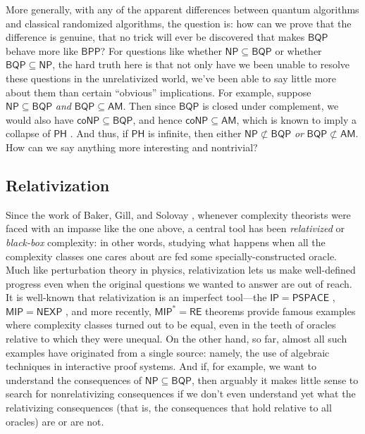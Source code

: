 \documentclass[10pt,a4paper]{article}
\begin{document}
More generally, with any of the apparent differences between quantum algorithms and classical randomized algorithms, the question is: how can we prove that the difference is genuine, that no trick will ever be discovered that makes $\mathsf{BQP}$ behave more like $\mathsf{BPP}$? For questions like whether $\mathsf{NP} \subseteq \mathsf{BQP}$ or whether $\mathsf{BQP} \subseteq \mathsf{NP}$, the hard truth here is that not only have we been unable to resolve these questions in the unrelativized world, we've been able to say little more about them than certain ``obvious'' implications.  For example, suppose $\mathsf{NP} \subseteq \mathsf{BQP}$ \textit{and} $\mathsf{BQP} \subseteq \mathsf{AM}$.  Then since $\mathsf{BQP}$ is closed under complement, we would also have $\mathsf{coNP} \subseteq \mathsf{BQP}$, and hence $\mathsf{coNP} \subseteq \mathsf{AM}$, which is known to imply a collapse of $\mathsf{PH}$ \cite{BHZ87}.  And thus, if $\mathsf{PH}$ is infinite, then either $\mathsf{NP} \not\subset \mathsf{BQP}$ \textit{or} $\mathsf{BQP} \not\subset \mathsf{AM}$.  How can we say anything more interesting and nontrivial?

\subsection{Relativization}
Since the work of Baker, Gill, and Solovay \cite{BGS75}, whenever complexity theorists were faced with an impasse like the one above, a central tool has been \textit{relativized} or \textit{black-box} complexity: in other words, studying what happens when all the complexity classes one cares about are fed some specially-constructed oracle.  Much like perturbation theory in physics, relativization lets us make well-defined progress even when the original questions we wanted to answer are out of reach.  It is well-known that relativization is an imperfect tool---the $\mathsf{IP}=\mathsf{PSPACE}$ \cite{Sha92}, $\mathsf{MIP}=\mathsf{NEXP}$ \cite{BFL91}, and more recently, $\mathsf{MIP}^*=\mathsf{RE}$ \cite{JNVWY20} theorems provide famous examples where complexity classes turned out to be equal, even in the teeth of oracles relative to which they were unequal.  On the other hand, so far, almost all such examples have originated from a single source: namely, the use of algebraic techniques in interactive proof systems.  And if, for example, we want to understand the consequences of $\mathsf{NP} \subseteq \mathsf{BQP}$, then arguably it makes little sense to search for nonrelativizing consequences if we don't even understand yet what the relativizing consequences (that is, the consequences that hold relative to all oracles) are or are not.
\end{document}
